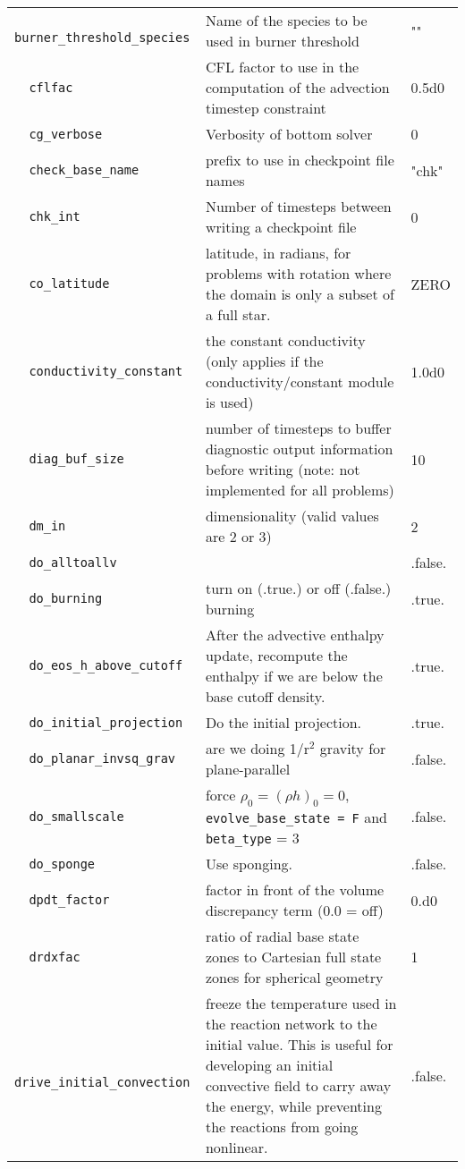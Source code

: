 {\begin{center}
\begin{longtable}{|l|p{3.25in}|l|}
\verb=  burner_threshold_species  = &   Name of the species to be used in burner threshold  &  "" \\
\verb=  cflfac  = &   CFL factor to use in the computation of the advection timestep constraint  &  0.5d0 \\
\verb=  cg_verbose  = &   Verbosity of bottom solver  &  0 \\
\verb=  check_base_name  = &   prefix to use in checkpoint file names  &  "chk" \\
\verb=  chk_int  = &   Number of timesteps between writing a checkpoint file  &  0 \\
\verb=  co_latitude  = &   latitude, in radians, for problems with rotation where the domain is only a subset of a full star.  &  ZERO \\
\verb=  conductivity_constant  = &   the constant conductivity (only applies if the conductivity/constant module is used)  &  1.0d0 \\
\verb=  diag_buf_size  = &   number of timesteps to buffer diagnostic output information before writing (note: not implemented for all problems)  &  10 \\
\verb=  dm_in  = &   dimensionality (valid values are 2 or 3)  &  2 \\
\verb=  do_alltoallv  = &    &  .false. \\
\verb=  do_burning  = &   turn on (.true.) or off (.false.) burning  &  .true. \\
\verb=  do_eos_h_above_cutoff  = &   After the advective enthalpy update, recompute the enthalpy if we are below the base cutoff density.  &  .true. \\
\verb=  do_initial_projection  = &   Do the initial projection.  &  .true. \\
\verb=  do_planar_invsq_grav  = &   are we doing 1/r$^2$ gravity for plane-parallel  &  .false. \\
\verb=  do_smallscale  = &   force $\rho_0 = (\rho h)_0 = 0$, {\tt evolve\_base\_state = F} and {\tt beta\_type} = 3  &  .false. \\
\verb=  do_sponge  = &   Use sponging.  &  .false. \\
\verb=  dpdt_factor  = &   factor in front of the volume discrepancy term (0.0 = off)  &  0.d0 \\
\verb=  drdxfac  = &   ratio of radial base state zones to Cartesian full state zones for spherical geometry  &  1 \\
\verb=  drive_initial_convection  = &   freeze the temperature used in the reaction network to the initial value.  This is useful for developing an initial convective field to carry away the energy, while preventing the reactions from going nonlinear.  &  .false. \\

\end{longtable}
\end{center}}

